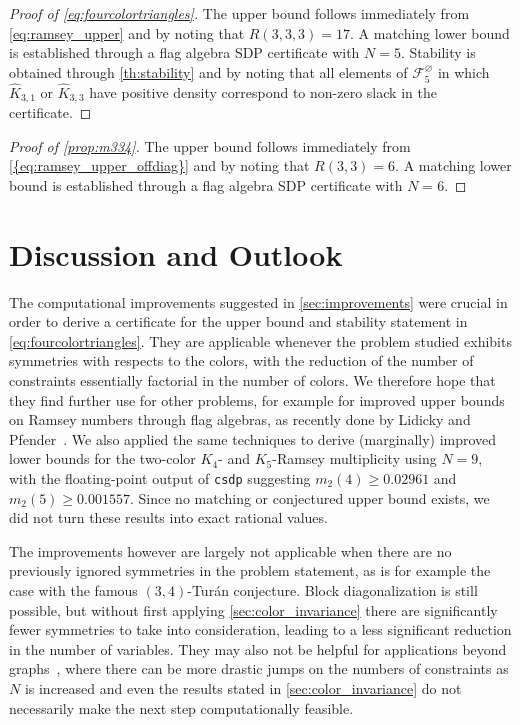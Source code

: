 \documentclass[a4paper,11pt]{article}
\numberwithin{equation}{section}
\newcommand{\mF}{\mathcal{F}}
\begin{document}
\begin{proof}[Proof of \cref{eq:fourcolortriangles}]
    The upper bound follows immediately from \cref{eq:ramsey_upper} and by noting that $R(3,3,3) = 17$. A matching lower bound is established through a flag algebra SDP certificate with $N = 5$. Stability is obtained through \cref{th:stability} and by noting that all elements of $\mF^\varnothing_5$ in which $\hat{K}_{3,1}$ or $\hat{K}_{3,3}$ have positive density correspond to non-zero slack in the certificate.
\end{proof}


\begin{proof}[Proof of \cref{prop:m334}]
    The upper bound follows immediately from \cref{{eq:ramsey_upper_offdiag}} and by noting that $R(3,3) = 6$. A matching lower bound is established through a flag algebra SDP certificate with $N = 6$. 
\end{proof}



\section{Discussion and Outlook}\label{sec:discussion}

The computational improvements suggested in \cref{sec:improvements} were crucial in order to derive a certificate for the upper bound and stability statement in \cref{eq:fourcolortriangles}. They are applicable whenever the problem studied exhibits symmetries with respects to the colors, with the reduction of the number of constraints essentially factorial in the number of colors. We therefore hope that they find further use for other problems, for example for improved upper bounds on Ramsey numbers through flag algebras, as recently done by Lidicky and Pfender~\cite{lidicky2021semidefinite}.  We also applied the same techniques to derive (marginally) improved lower bounds for the two-color $K_4$- and $K_5$-Ramsey multiplicity using $N = 9$, with the floating-point output of {\tt csdp} suggesting $m_2(4) \geq 0.02961$ and $m_2(5) \geq 0.001557$. Since no matching or conjectured upper bound exists, we did not turn these results into exact rational values.

The improvements however are largely not applicable when there are no previously ignored symmetries in the problem statement, as is for example the case with the famous $(3,4)$-Tur{\'a}n conjecture. Block diagonalization is still possible, but without first applying \cref{sec:color_invariance} there are significantly fewer symmetries to take into consideration, leading to a less significant reduction in the number of variables. They may also not be helpful for applications beyond graphs~\cite{baber2012turan, balogh2014upper, sliacan2018improving, rue2023rado}, where there can be more drastic jumps on the numbers of constraints as $N$ is increased and even the results stated in \cref{sec:color_invariance} do not necessarily make the next step computationally feasible.
\end{document}

